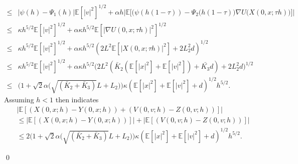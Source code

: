 \documentclass[12pt]{article}
\numberwithin{equation}{section}
\renewenvironment{proof}%
  {\begin{trivlist}%
   \item[]\ignorespaces}%
  {\qed\end{trivlist}}
\newcommand{\E}{\mathbb{E}}
\newcommand{\U}{\nabla U}
\begin{document}
\begin{proof}
\begin{align}
        \leq & |\psi(h)-\Psi_1(h)|\mathbb{E}[|v|^2]^{1/2}+\alpha h \Big|\mathbb{E} \big[ \big(\psi(h(1-\tau))-\Psi_2(h(1-\tau) \big)\nabla U \big(X(0,x;\tau h) \big) \big] \Big|\nonumber\\
        \leq & \kappa h^{5/2}\mathbb{E}[|v|^2]^{1/2}+\alpha\kappa h^{5/2}\E[|\U(0,x;\tau h)|^2]^{1/2}\nonumber\\
        \leq & \kappa h^{5/2}\mathbb{E}[|v|^2]^{1/2}+\alpha\kappa h^{5/2} (2L^2\E[|X(0,x;\tau h)|^2]+2L_2^2d)^{1/2} \nonumber\\
        \leq & \kappa h^{5/2}\mathbb{E}[|v|^2]^{1/2}+\alpha\kappa h^{5/2} \big(2L^2(\bar{K}_2(\E[|x|^2]+\E[|v|^2])+\bar{K_3}d)+2L_2^2d \big)^{1/2}\nonumber\\
        \leq & \Big(1+\sqrt{2}\alpha \big(\sqrt{(\bar{K}_2+\bar{K}_3)}L+L_2 \big)\Big)\kappa (\E[|x|^2]+\E[|v|^2]+d)^{1/2}h^{5/2}.
    \end{align}
    Assuming $h < 1$ then indicates
    \begin{align}
        & \big|\mathbb{E}[(X(0,x;h)-Y(0,x;h))+(V(0,v;h)-Z(0,v;h))] \big|\nonumber \\
        &\leq  \big|\mathbb{E}[(X(0,x;h)-Y(0,x;h))] \big|+ \big|\mathbb{E}[(V(0,v;h)-Z(0,v;h))] \big|\nonumber\\
        &\leq 2\Big(1+\sqrt{2}\alpha\big(\sqrt{(\bar{K}_2+\bar{K}_3)}L+L_2 \big)\Big)\kappa (\E[|x|^2]+\E[|v|^2]+d)^{1/2}h^{5/2}.
    \end{align}
     

\end{proof}
\end{document}
